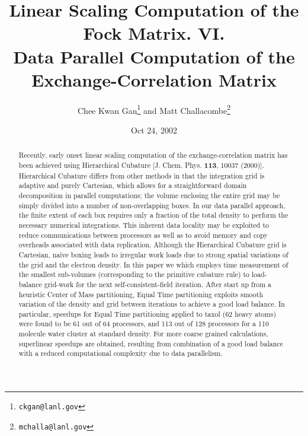 \commentoutA{\documentclass[prb,aps,twocolumn,twocolumngrid]{revtex4}}
\begin{document}
\title[Short Title]{ Linear Scaling Computation of the Fock
Matrix. VI. \\ Data Parallel Computation of the Exchange-Correlation
Matrix }

\author{Chee Kwan Gan\footnote{{\tt ckgan@lanl.gov}} and Matt
Challacombe\footnote{{\tt mchalla@lanl.gov}}}
 

\date{Oct 24, 2002}

\begin{abstract}
Recently, early onset linear scaling computation of the
exchange-correlation matrix has been achieved using Hierarchical
Cubature [J. Chem. Phys. {\bf 113}, 10037 (2000)]. Hierarchical
Cubature differs from other methods in that the integration grid is
adaptive and purely Cartesian, which allows for a straightforward
domain decomposition in parallel computations; the volume enclosing
the entire grid may be simply divided into a number of non-overlapping
boxes. In our data parallel approach, the finite extent of each box
requires only a fraction of the total density to perform the necessary
numerical integrations.  This inherent data locality may be exploited
to reduce communications between processors as well as to avoid memory
and copy overheads associated with data replication.  Although the
Hierarchical Cubature grid is Cartesian, naive boxing leads to
irregular work loads due to strong spatial variations of the grid and
the electron density.  In this paper we
which employs time measurement of the smallest sub-volumes
(corresponding to the primitive cubature rule) to load-balance
grid-work for the next self-consistent-field iteration.  After start
up from a heuristic Center of Mass partitioning, Equal Time
partitioning exploits smooth variation of the density and grid between
iterations to achieve a good load balance. In particular, speedups for
Equal Time partitioning applied to taxol (62 heavy atoms) were found
to be 61 out of 64 processors, and 113 out of 128 processors for a 110
molecule water cluster at standard density.  For more coarse grained
calculations, superlinear speedups are obtained, resulting from
combination of a good load balance with a reduced computational
complexity due to data parallelism.
\end{abstract}
\end{document}
